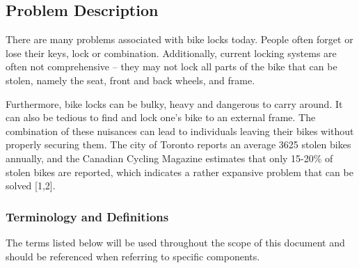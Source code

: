 \documentclass[12pt]{article}
\begin{document}
\subsection{Problem Description} \label{Sec_pd}

There are many problems associated with bike locks today.  People often forget or lose their keys, lock or combination.  Additionally, current locking systems are often not comprehensive – they may not lock all parts of the bike that can be stolen, namely the seat, front and back wheels, and frame.  


Furthermore, bike locks can be bulky, heavy and dangerous to carry around. It can also be tedious to find and lock one’s bike to an external frame.  The combination of these nuisances can lead to individuals leaving their bikes without properly securing them.  The city of Toronto reports an average 3625 stolen bikes annually, and the Canadian Cycling Magazine estimates that only 15-20\% of stolen bikes are reported, which indicates a rather expansive problem that can be solved [1,2].  

\subsubsection{Terminology and  Definitions}

The terms listed below will be used throughout the scope of this document and should be referenced when referring to specific components.  
\end{document}
